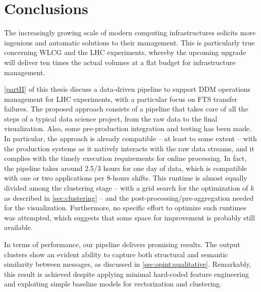 \chapter{Conclusions} \label{ch:opint_conclusions}

The increasingly growing scale of modern computing infrastructures solicits more ingenious and automatic solutions to their management.
This is particularly true concerning WLCG and the LHC experiments, whereby the upcoming upgrade will deliver ten times the actual volumes at a flat budget for infrastructure management.

\cref{partII} of this thesis discuss a data-driven pipeline to support DDM operations management for LHC experiments, with a particular focus on FTS transfer failures.
The proposed approach consists of a pipeline that takes care of all the steps of a typical data science project, from the raw data to the final visualization.
Also, some pre-production integration and testing has been made.
In particular, the approach is already compatible -- at least to some extent -- with the production systems as it natively interacts with the raw data streams, and it complies with the timely execution requirements for online processing.
In fact,
the pipeline takes around 2.5/3 hours for one day of data, which is compatible with one or two applications per 8-hours shifts.
This runtime is almost equally divided among the clustering stage -- with a grid search for the optimization of $k$ as described in \cref{sec:clustering} -- and the post-processing/pre-aggregation needed for the visualization.
Furthermore, no specific effort to optimize such runtimes was attempted, which suggests that some space for improvement is probably still available.

In terms of performance, our pipeline delivers promising results. 
The output clusters show an evident ability to capture both structural and semantic similarity between messages, as discussed in \cref{sec:opint:qualitative}.
Remarkably, this result is achieved despite applying minimal hard-coded feature engineering and exploiting simple baseline models for vectorization and clustering. 


